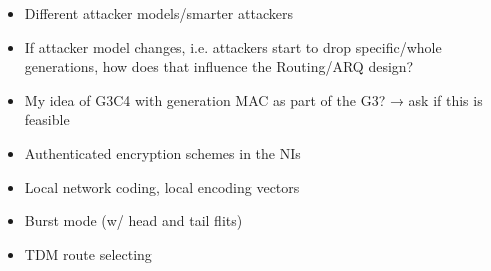 \begin{itemize}
    \item Different attacker models/smarter attackers
    \item If attacker model changes, i.e. attackers start to drop specific/whole generations,
        how does that influence the Routing/ARQ design?
    \item My idea of G3C4 with generation MAC as part of the G3? → ask if this is feasible
    \item Authenticated encryption schemes in the NIs
    \item Local network coding, local encoding vectors
    \item Burst mode (w/ head and tail flits)
    \item TDM route selecting
\end{itemize}

